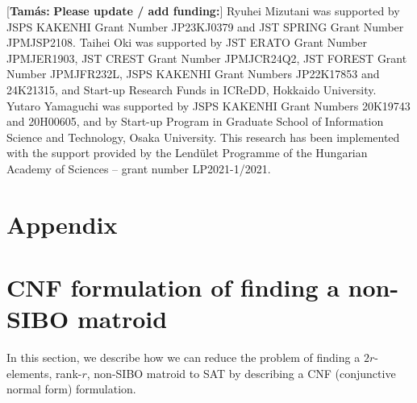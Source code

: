 \documentclass{article}
\theoremstyle{definition}
\newcommand{\snote}[1]{{\color{cyan}[{\tiny \textbf{Tamás:} \bf #1}]\marginpar{\color{cyan}*}}}
\newcommand{\snote}[1]{}
\begin{document}
\snote{Please update / add funding:} 
Ryuhei Mizutani was supported by JSPS KAKENHI Grant Number JP23KJ0379 and JST SPRING Grant Number JPMJSP2108.
Taihei Oki was supported by JST ERATO Grant Number JPMJER1903, JST CREST Grant Number JPMJCR24Q2, JST FOREST Grant Number JPMJFR232L, JSPS KAKENHI Grant Numbers JP22K17853 and 24K21315, and Start-up Research Funds in ICReDD, Hokkaido University.
Yutaro Yamaguchi was supported by JSPS KAKENHI Grant Numbers 20K19743 and 20H00605, and by Start-up Program in Graduate School of Information Science and Technology, Osaka University.
This research has been implemented with the support provided by the Lend\"ulet Programme of the Hungarian Academy of Sciences -- grant number LP2021-1/2021.





\newpage
\appendix
\section*{Appendix}

\section{CNF formulation of finding a non-SIBO matroid}\label{sec:sat}

In this section, we describe how we can reduce the problem of finding a $2r$-elements, rank-$r$, non-SIBO matroid to SAT by describing a CNF (conjunctive normal form) formulation.
\end{document}
